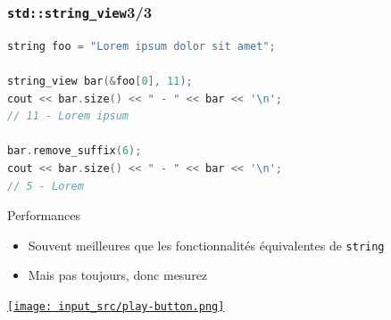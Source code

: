 \documentclass[C++.tex]{subfiles}
\begin{document}
\begin{frame}[fragile]
	\frametitle{\lstinline|std::string_view|\titlehfill{}3/3}
	\begin{lstlisting}[language=C++]
string foo = "Lorem ipsum dolor sit amet";

string_view bar(&foo[0], 11);
cout << bar.size() << " - " << bar << '\n';
// 11 - Lorem ipsum

bar.remove_suffix(6);
cout << bar.size() << " - " << bar << '\n';
// 5 - Lorem\end{lstlisting}

	\begin{exampleblock}{Performances}
		\begin{itemize}
			\item Souvent meilleures que les fonctionnalités équivalentes de \lstinline|string|
			\item Mais pas toujours, donc mesurez
		\end{itemize} 

	\end{exampleblock}

	\hfill
	\href{https://godbolt.org/#g:!((g:!((g:!((h:codeEditor,i:(filename:'1',fontScale:14,fontUsePx:'0',j:1,lang:c%2B%2B,selection:(endColumn:1,endLineNumber:27,positionColumn:1,positionLineNumber:27,selectionStartColumn:1,selectionStartLineNumber:27,startColumn:1,startLineNumber:27),source:'%23include+%3Ciostream%3E%0A%23include+%3Cstring%3E%0A%23include+%3Cstring_view%3E%0A%0Aint+main()%0A%7B%0A++%7B%0A++++std::string+foo+%3D+%22Lorem+ipsum+dolor+sit+amet,+consectetur+adipiscing+elit.+Sed+non+risus.%22%3B%0A%0A++++std::string_view+bar(%26foo%5B0%5D,+11)%3B%0A++++std::cout+%3C%3C+bar.size()+%3C%3C+%22+-+%22+%3C%3C+bar+%3C%3C+!'%5Cn!'%3B%0A%0A++++foo%5B0%5D+%3D+!'l!'%3B%0A++++std::cout+%3C%3C+bar.size()+%3C%3C+%22+-+%22+%3C%3C+bar+%3C%3C+!'%5Cn!'%3B%0A++++std::cout+%3C%3C+bar%5B0%5D+%3C%3C+!'%5Cn!'%3B%0A%0A++++bar.remove_suffix(6)%3B%0A++++std::cout+%3C%3C+bar.size()+%3C%3C+%22+-+%22+%3C%3C+bar+%3C%3C+!'%5Cn!'%3B%0A++%7D%0A%0A++%7B%0A++++char+foo%5B3%5D+%3D+%7B!'B!',+!'a!',+!'r!'%7D%3B%0A++++std::string_view+bar(foo,+sizeof+foo)%3B%0A++++std::cout+%3C%3C+bar.size()+%3C%3C+%22+-+%22+%3C%3C+bar+%3C%3C+!'%5Cn!'%3B%0A++%7D%0A%7D%0A'),l:'5',n:'0',o:'C%2B%2B+source+%231',t:'0')),k:50,l:'4',n:'0',o:'',s:0,t:'0'),(g:!((h:executor,i:(argsPanelShown:'1',compilationPanelShown:'0',compiler:g112,compilerOutShown:'0',execArgs:'',execStdin:'',fontScale:14,fontUsePx:'0',j:1,lang:c%2B%2B,libs:!((name:boost,ver:'175')),options:'-std%3Dc%2B%2B17+-Wall+-Wextra',source:1,stdinPanelShown:'1',tree:'1',wrap:'0'),l:'5',n:'0',o:'Executor+x86-64+gcc+11.2+(C%2B%2B,+Editor+%231)',t:'0')),header:(),k:50,l:'4',n:'0',o:'',s:0,t:'0')),l:'2',n:'0',o:'',t:'0')),version:4}{\texttt{[image: input\_src/play-button.png]}}
\end{frame}
\end{document}
